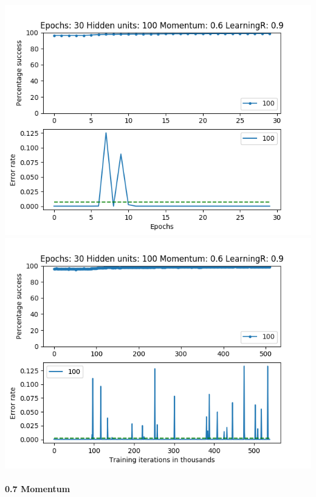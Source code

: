 \documentclass[11pt]{article}
\makeatletter
\def\maxwidth{\ifdim\Gin@nat@width>\linewidth\linewidth
    \else\Gin@nat@width\fi}
\let\Oldincludegraphics\includegraphics
\renewcommand{\includegraphics}[1]{\Oldincludegraphics[width=.8\maxwidth]{#1}}
\makeatother
\begin{document}
\includegraphics{Experiment1/E1_NN_Epoch_Momentum_0.6_30Epochs_100_LR_0.9_Hiddenunits.png}
\includegraphics{Experiment1/E1_NN_Training_Momentum_0.6_30Epochs_100_LR_0.9_Hiddenunits.png}

\hypertarget{momentum-7}{%
\paragraph{0.7 Momentum}\label{momentum-7}}
\end{document}
